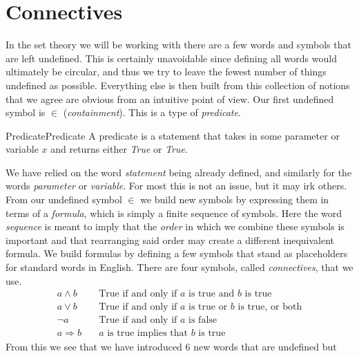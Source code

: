 \section{Connectives}
    In the set theory we will be working with there are a few words and symbols
    that are left undefined. This is certainly unavoidable since defining all
    words would ultimately be circular, and thus we try to leave the fewest
    number of things undefined as possible. Everything else is then built from
    this collection of notions that we agree are obvious from an intuitive point
    of view. Our first undefined symbol is $\in$ (\textit{containment}). This is
    a type of \textit{\gls{predicate}}.
    \begin{fdefinition}{Predicate}{Predicate}
        A \gls{predicate} is a statement that takes in some parameter or
        variable $x$ and returns either \textit{True} or \textit{True}.
    \end{fdefinition}
    We have relied on the word \textit{statement} being already defined, and
    similarly for the words \textit{parameter} or \textit{variable}. For most
    this is not an issue, but it may irk others. From our undefined symbol $\in$
    we build new symbols by expressing them in terms of a
    \textit{formula}, which is simply a finite
    sequence of symbols. Here the word \textit{sequence} is meant to imply that
    the \textit{order} in which we combine these symbols is important and that
    rearranging said order may create a different inequivalent formula. We build
    formulas by defining a few symbols that stand as placeholders for standard
    words in English. There are four symbols, called
    \textit{\glspl{connective}}, that we use.
    \begin{align*}
        a\land{b}\quad
        &\textrm{True if and only if }a
        \textrm{ is true and }b\textrm{ is true}
        \tag{Conjunction}\\
        a\lor{b}\quad
        &\textrm{True if and only if }a
        \textrm{ is true or }b\textrm{ is true, or both}
        \tag{Disjunction}\\
        \neg{a}\quad
        &\textrm{True if and only if }a\textrm{ is false}
        \tag{Negation}\\
        a\Rightarrow{b}\quad
        &a\textrm{ is true implies that }b\textrm{ is true}
        \tag{Implication}
    \end{align*}
    From this we see that we have introduced 6 new words that are undefined but
